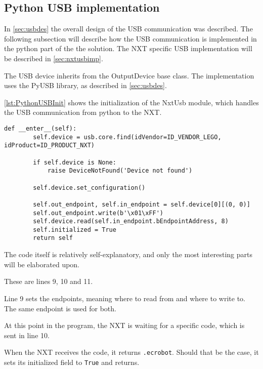 \subsection{Python USB implementation}\label{sol:subsec:pythonusb}
In \autoref{sec:usbdes} the overall design of the USB communication was described.
The following subsection will describe how the USB communication is implemented in the python part of the the solution.
The NXT specific USB implementation will be described in \autoref{sec:nxtusbimp}.

The USB device inherits from the OutputDevice base class.
The implementation uses the PyUSB library, as described in \autoref{sec:usbdes}\cite{PyUSB}.

\autoref{lst:PythonUSBInit} shows the initialization of the NxtUsb module, which handles the USB communication from python to the NXT.
\begin{lstlisting}[label={lst:PythonUSBInit},caption={The initialization of PyUSB{.} Comments removed}]
    def __enter__(self):
        self.device = usb.core.find(idVendor=ID_VENDOR_LEGO, idProduct=ID_PRODUCT_NXT)

        if self.device is None:
            raise DeviceNotFound('Device not found')

        self.device.set_configuration()

        self.out_endpoint, self.in_endpoint = self.device[0][(0, 0)]
        self.out_endpoint.write(b'\x01\xFF') 
        self.device.read(self.in_endpoint.bEndpointAddress, 8) 
        self.initialized = True
        return self
\end{lstlisting}

The code itself is relatively self-explanatory, and only the most interesting parts will be elaborated upon.

These are lines 9, 10 and 11.

Line 9 sets the endpoints, meaning where to read from and where to write to.
The same endpoint is used for both.

At this point in the program, the NXT is waiting for a specific code, which is sent in line 10.

When the NXT receives the code, it returns \texttt{{.}ecrobot}.
Should that be the case, it sets its initialized field to \texttt{True} and returns.





